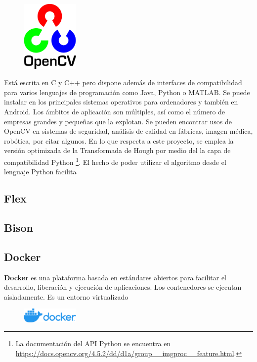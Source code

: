 \begin{figure}
    \centering
    \includegraphics[width=0.25\textwidth]{imaxes/e-fundamentos-tecnologicos/logo-opencv.png}
\end{figure}

Está escrita en C y C++ pero dispone además de interfaces de compatibilidad para varios lenguajes de programación como Java, Python o MATLAB. Se puede instalar en los principales sistemas operativos para ordenadores y también en Android. Los ámbitos de aplicación son múltiples, así como el número de empresas grandes y pequeñas que la explotan. Se pueden encontrar usos de OpenCV en sistemas de seguridad, análisis de calidad en fábricas, imagen médica, robótica, por citar algunos. En lo que respecta a este proyecto, se emplea la versión optimizada de la Transformada de Hough por medio del la capa de compatibilidad Python \footnote{La documentación del API Python se encuentra en \url{https://docs.opencv.org/4.5.2/dd/d1a/group__imgproc__feature.html}.}. El hecho de poder utilizar el algoritmo desde el lenguaje Python facilita 

\subsection{Flex}

\subsection{Bison}



\subsection{Docker}

\textbf{Docker} \cite{dockerincEmpoweringAppDevelopment} es una plataforma basada en estándares abiertos para facilitar el desarrollo, liberación y ejecución de aplicaciones.
Los contenedores se ejecutan aisladamente. Es un entorno virtualizado

\begin{figure}
    \centering
    \includegraphics[width=0.25\textwidth]{imaxes/e-fundamentos-tecnologicos/logo-docker.png}
\end{figure}

